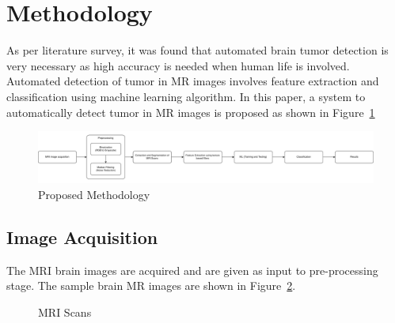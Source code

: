 \documentclass[11pt]{article}
\begin{document}
	\section[methodology]{Methodology}

	As per literature survey, it was found that automated  brain  tumor
	detection  is  very  necessary  as  high accuracy is needed when human life
	is involved.  Automated detection of tumor in MR images involves feature
	extraction and  classification  using  machine  learning  algorithm.  In
	this paper, a system to automatically detect tumor in MR images is proposed
	as shown in Figure~\ref{Proposed Methodology}

	\begin{figure}[h]
		\centering
		\includegraphics[width=1\linewidth]{imgs/methodology}
		\caption{Proposed Methodology}%
		\label{Proposed Methodology}
	\end{figure}

	\subsection{Image Acquisition}%
	\label{sub:Image Acquisition}

	The MRI brain images are acquired and are
	given as input to pre-processing stage. The sample brain MR images are shown
	in Figure~\ref{MRIScans}.

	\begin{figure}[H]
		\centering
		\hspace{0.5cm}
		\caption{MRI Scans}
		\label{MRIScans}
	\end{figure}
\end{document}
